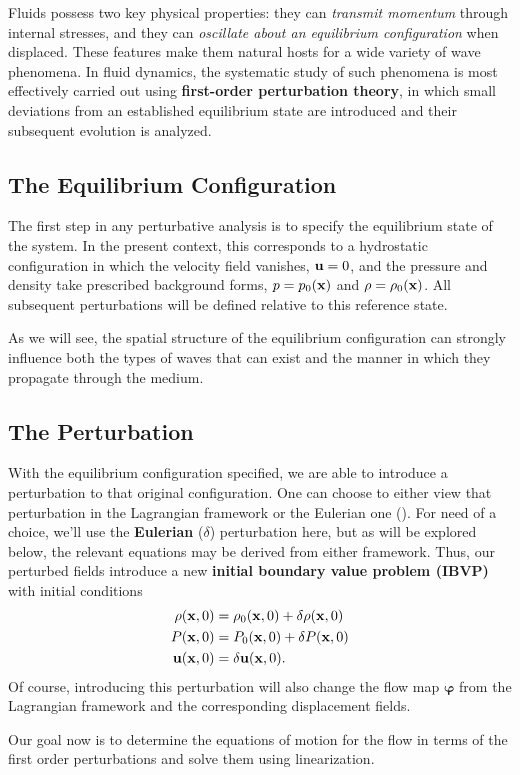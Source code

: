 Fluids possess two key physical properties: they can \emph{transmit momentum} through internal stresses, and they can \emph{oscillate about an equilibrium configuration} when displaced. These features make them natural hosts for a wide variety of wave phenomena. In fluid dynamics, the systematic study of such phenomena is most effectively carried out using \textbf{first-order perturbation theory}, in which small deviations from an established equilibrium state are introduced and their subsequent evolution is analyzed.

\subsection*{The Equilibrium Configuration}

The first step in any perturbative analysis is to specify the equilibrium state of the system. In the present context, this corresponds to a hydrostatic configuration in which the velocity field vanishes, ${\bf u} = 0$, and the pressure and density take prescribed background forms, $p = p_0({\bf x})$ and $\rho = \rho_0({\bf x})$. All subsequent perturbations will be defined relative to this reference state.

\begin{remark}
    As we will see, the spatial structure of the equilibrium configuration can strongly influence both the types of waves that can exist and the manner in which they propagate through the medium.
\end{remark}

\subsection*{The Perturbation}

With the equilibrium configuration specified, we are able to introduce a perturbation to that original configuration. One can choose to either view that perturbation in the Lagrangian framework or the Eulerian one (). For need of a choice, we'll use the \textbf{Eulerian} ($\delta$) perturbation here, but as will be explored below, the relevant equations may be derived from either framework. Thus, our perturbed fields introduce a new \textbf{initial boundary value problem (IBVP)} with initial conditions
\begin{equation}
    \begin{aligned}
        \rho({\bf x},0) &= \rho_0({\bf x},0) + \delta \rho({\bf x},0)\\
        P({\bf x},0) &= P_0({\bf x},0) + \delta P({\bf x},0)\\
       {\bf u}({\bf x},0) &= \delta {\bf u}({\bf x},0).
    \end{aligned}
\end{equation}
Of course, introducing this perturbation will also change the flow map $\boldsymbol{\varphi}$ from the Lagrangian framework and the corresponding displacement fields.
\par
Our goal now is to determine the equations of motion for the flow in terms of the first order perturbations and solve them using linearization.

